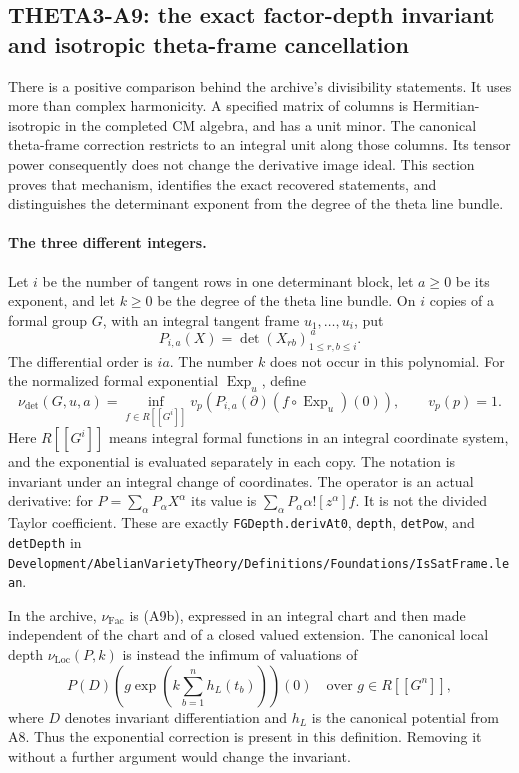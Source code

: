 \subsection{THETA3-A9: the exact factor-depth invariant and isotropic theta-frame cancellation}\label{A9}

There is a positive comparison behind the archive's divisibility
statements.  It uses more than complex harmonicity.  A specified
matrix of columns is Hermitian-isotropic in the completed CM
algebra, and has a unit minor.  The canonical theta-frame
correction restricts to an integral unit along those columns.
Its tensor power consequently does not change the derivative
image ideal.  This section proves that mechanism, identifies
the exact recovered statements, and distinguishes the
determinant exponent from the degree of the theta line bundle.

\paragraph{The three different integers.}
Let $i$ be the number of tangent rows in one determinant block,
let $a\geq0$ be its exponent, and let $k\geq0$ be the degree of
the theta line bundle.  On $i$ copies of a formal group $G$,
with an integral tangent frame $u_1,\ldots,u_i$, put
\[
 P_{i,a}(X)=\det(X_{rb})_{1\leq r,b\leq i}^{\,a}.
 \tag{A9a}
\]
The differential order is $ia$.  The number $k$ does not occur
in this polynomial.  For the normalized formal exponential
$\operatorname{Exp}_u$, define
\[
 \nu_{\det}(G,u,a)
   =\inf_{f\in R[[G^i]]}
       v_p\!\left(
         P_{i,a}(\partial)
            (f\circ\operatorname{Exp}_u)(0)\right),
 \qquad v_p(p)=1 .
 \tag{A9b}
\]
Here $R[[G^i]]$ means integral formal functions in an integral
coordinate system, and the exponential is evaluated separately
in each copy.  The notation is invariant under an integral
change of coordinates.  The operator is an actual derivative:
for $P=\sum_\alpha P_\alpha X^\alpha$ its value is
$\sum_\alpha P_\alpha\alpha![z^\alpha]f$.
It is not the divided Taylor coefficient.  These are exactly
\texttt{FGDepth.derivAt0}, \texttt{depth}, \texttt{detPow}, and
\texttt{detDepth} in
\texttt{Development/AbelianVarietyTheory/Definitions/Foundations/IsSatFrame.lean}.

In the archive, $\nu_{\mathrm{Fac}}$ is (A9b), expressed in an
integral chart and then made independent of the chart and of a
closed valued extension.  The canonical local depth
$\nu_{\mathrm{Loc}}(P,k)$ is instead the infimum of valuations
of
\[
 P(D)\left(g\exp\!\left(k\sum_{b=1}^n h_L(t_b)\right)\right)(0)
 \quad\text{over }g\in R[[G^n]],
 \tag{A9c}
\]
where $D$ denotes invariant differentiation and $h_L$ is the
canonical potential from A8.  Thus the exponential correction
is present in this definition.  Removing it without a further
argument would change the invariant.

